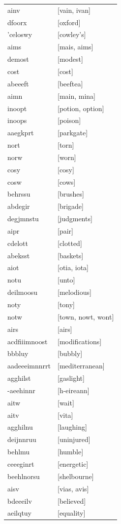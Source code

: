 \documentclass{article}
\begin{document}
\begin{tabular}{ll}
ainv & [vain, ivan] \\
dfoorx & [oxford] \\
'celoswy & [cowley's] \\
aims & [mais, aims] \\
demost & [modest] \\
cost & [cost] \\
abeeeft & [beeftea] \\
aimn & [main, mina] \\
inoopt & [potion, option] \\
inoops & [poison] \\
aaegkprt & [parkgate] \\
nort & [torn] \\
norw & [worn] \\
cosy & [cosy] \\
cosw & [cows] \\
behrssu & [brushes] \\
abdegir & [brigade] \\
degjmnstu & [judgments] \\
aipr & [pair] \\
cdelott & [clotted] \\
abeksst & [baskets] \\
aiot & [otia, iota] \\
notu & [unto] \\
deilmoosu & [melodious] \\
noty & [tony] \\
notw & [town, nowt, wont] \\
airs & [airs] \\
acdfiiimnoost & [modifications] \\
bbbluy & [bubbly] \\
aadeeeimnnrrt & [mediterranean] \\
agghilst & [gaslight] \\
-aeehinnr & [h-eireann] \\
aitw & [wait] \\
aitv & [vita] \\
agghilnu & [laughing] \\
deijnnruu & [uninjured] \\
behlmu & [humble] \\
ceeeginrt & [energetic] \\
beehlnorsu & [shelbourne] \\
aisv & [vias, avis] \\
bdeeeilv & [believed] \\
aeilqtuy & [equality] \\

\end{tabular}
\end{document}

